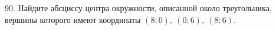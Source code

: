 90. Найдите абсциссу центра окружности, описанной около треугольника, вершины которого имеют координаты $(8;0),\ (0;6),\ (8;6).$\\
